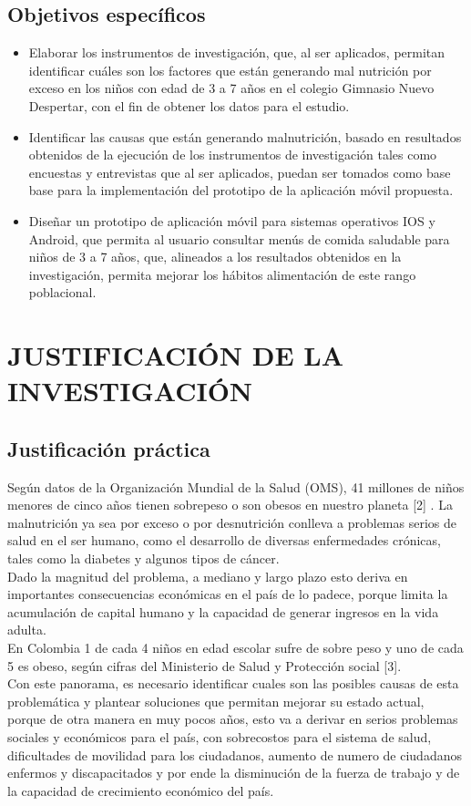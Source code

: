 \subsection{Objetivos específicos}
\begin{itemize}
	\item Elaborar los instrumentos de investigación, que, al ser aplicados, permitan identificar cuáles son los factores que están generando mal nutrición por exceso en los niños con edad de 3 a 7 años en el colegio Gimnasio Nuevo Despertar, con el fin  de obtener los datos para el estudio.\\ 
	\item Identificar las causas que están generando malnutrición, basado en resultados obtenidos de la ejecución de los instrumentos de investigación tales como encuestas y entrevistas que al ser aplicados, puedan ser tomados como base base para la implementación del prototipo de la aplicación móvil propuesta.\\
	\item Diseñar un prototipo de aplicación móvil para sistemas operativos IOS y Android, que permita al usuario consultar menús de comida saludable para niños de 3 a 7 años, que, alineados a los resultados obtenidos en la investigación, permita mejorar los hábitos alimentación de este rango poblacional.	
\end{itemize}
\section{JUSTIFICACIÓN DE LA INVESTIGACIÓN}
\subsection{Justificación práctica}
Según datos de la Organización Mundial de la Salud (OMS), 41 millones de niños menores de cinco años tienen sobrepeso o son obesos en nuestro planeta [2] . La malnutrición ya sea por exceso o por desnutrición conlleva a problemas serios de salud en el ser humano, como el desarrollo de diversas enfermedades crónicas, tales como la diabetes y algunos tipos de cáncer.\\
Dado la magnitud del problema, a mediano y largo plazo esto deriva en importantes consecuencias económicas en el país de lo padece, porque limita la acumulación de capital humano y la capacidad de generar ingresos en la vida adulta.\\
En Colombia 1 de cada 4 niños en edad escolar sufre de sobre peso y uno de cada 5 es obeso, según cifras del Ministerio de Salud y Protección social [3].\\
Con este panorama, es necesario identificar cuales son las posibles causas de esta problemática  y plantear soluciones que permitan mejorar su estado actual, porque de otra manera en muy pocos años, esto va a derivar en serios problemas sociales y económicos para el país, con sobrecostos para el sistema de salud, dificultades de movilidad para los ciudadanos, aumento de numero de ciudadanos enfermos y discapacitados y por ende la disminución de la fuerza de trabajo y de la capacidad de crecimiento económico del país.
